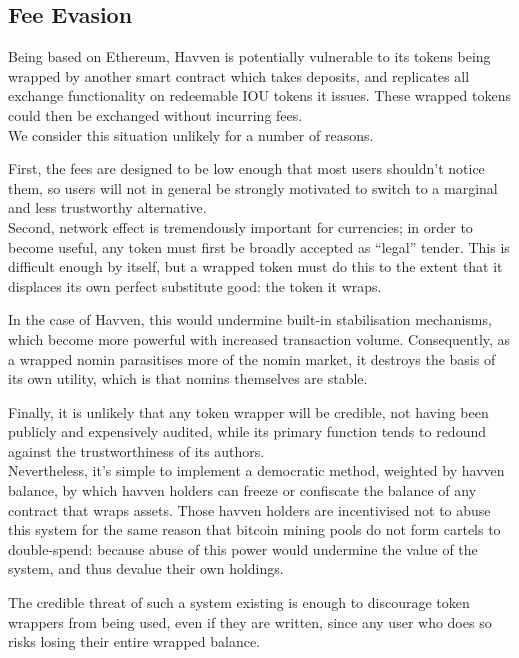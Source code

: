 \newpage

\subsection{Fee Evasion}

\noindent Being based on Ethereum, Havven is potentially vulnerable to its tokens being wrapped by another
smart contract which takes deposits, and replicates all exchange functionality on redeemable IOU tokens
it issues. These wrapped tokens could then be exchanged without incurring fees. \\

\noindent We consider this situation unlikely for a number of reasons.

\noindent First, the fees are designed to be low enough that most users
shouldn't notice them, so users will not in general be strongly motivated to switch
to a marginal and less trustworthy alternative. \\
\noindent Second, network effect is tremendously important for currencies; in order to
become useful, any token must first be broadly accepted as ``legal'' tender. This is difficult
enough by itself, but a wrapped token must do this to the extent that it displaces its own perfect
substitute good: the token it wraps.

\noindent In the case of Havven, this would undermine built-in stabilisation mechanisms,
which become more powerful with increased transaction volume.
Consequently, as a wrapped nomin parasitises more of the nomin market,
it destroys the basis of its own utility, which is that nomins themselves are stable.

\noindent Finally, it is unlikely that any token wrapper will be credible,
not having been publicly and expensively audited, while its primary function
tends to redound against the trustworthiness of its authors. \\

\noindent Nevertheless, it's simple to implement a democratic method, weighted by havven balance,
by which havven holders can freeze or confiscate the balance of any contract that wraps assets.
Those havven holders are incentivised not to abuse this system for the same reason that
bitcoin mining pools do not form cartels to double-spend: because abuse of this power
would undermine the value of the system, and thus devalue their own holdings.

\noindent The credible threat of such a system existing is enough to discourage token wrappers
from being used, even if they are written, since any user who does so risks losing their
entire wrapped balance.

\newpage